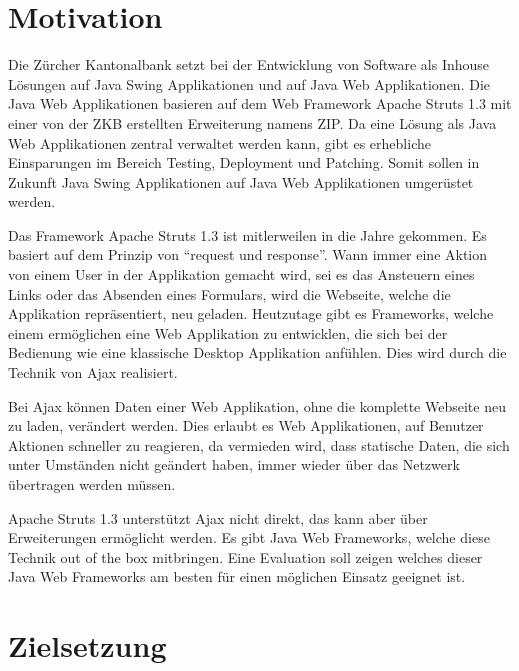   \section{Motivation}
  
  Die Zürcher Kantonalbank setzt bei der Entwicklung von Software als Inhouse
  Lösungen auf Java Swing Applikationen und auf Java Web Applikationen. Die
  Java Web Applikationen basieren auf dem Web Framework Apache Struts 1.3
  mit einer von der ZKB erstellten Erweiterung namens \ac{ZIP}. Da eine Lösung
  als Java Web Applikationen zentral verwaltet werden kann, gibt es erhebliche
  Einsparungen im Bereich Testing, Deployment und Patching. Somit sollen in
  Zukunft Java Swing Applikationen auf Java Web Applikationen umgerüstet werden.
  
  Das Framework Apache Struts 1.3 ist mitlerweilen in die Jahre gekommen. Es
  basiert auf dem Prinzip von ``request und response''. Wann immer eine Aktion
  von einem User in der Applikation gemacht wird, sei es das Ansteuern eines
  Links oder das Absenden eines Formulars, wird die Webseite, welche die
  Applikation repräsentiert, neu geladen. Heutzutage gibt es Frameworks, welche
  einem ermöglichen eine Web Applikation zu entwicklen, die sich bei der
  Bedienung wie eine klassische Desktop Applikation anfühlen. Dies wird durch
  die Technik von \ac{Ajax} realisiert.
  
  Bei \ac{Ajax} können Daten einer Web Applikation, ohne die komplette Webseite
  neu zu laden, verändert werden. Dies erlaubt es Web Applikationen, auf
  Benutzer Aktionen schneller zu reagieren, da vermieden wird, dass statische
  Daten, die sich unter Umständen nicht geändert haben, immer wieder über das
  Netzwerk übertragen werden müssen.
  
  Apache Struts 1.3 unterstützt \ac{Ajax} nicht direkt, das kann aber über
  Erweiterungen ermöglicht werden. Es gibt Java Web Frameworks, welche diese
  Technik out of the box mitbringen. Eine Evaluation soll zeigen welches dieser
  Java Web Frameworks am besten für einen möglichen Einsatz geeignet ist.
  
  \section{Zielsetzung}
  
